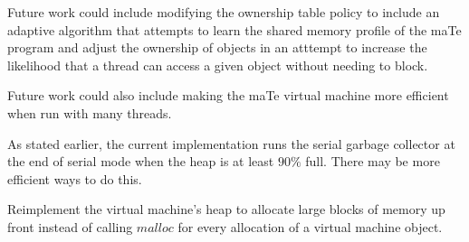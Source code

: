 Future work could include modifying the ownership table policy to
include an adaptive algorithm that attempts to learn the shared memory
profile of the maTe program and adjust the ownership of objects in an
atttempt to increase the likelihood that a thread can access a given
object without needing to block.

Future work could also include making the maTe virtual machine more
efficient when run with many threads.

As stated earlier, the current implementation runs the serial garbage
collector at the end of serial mode when the heap is at least $90\%$
full.  There may be more efficient ways to do this.

Reimplement the virtual machine's heap to allocate large blocks of
memory up front instead of calling $malloc$ for every allocation of a
virtual machine object.

